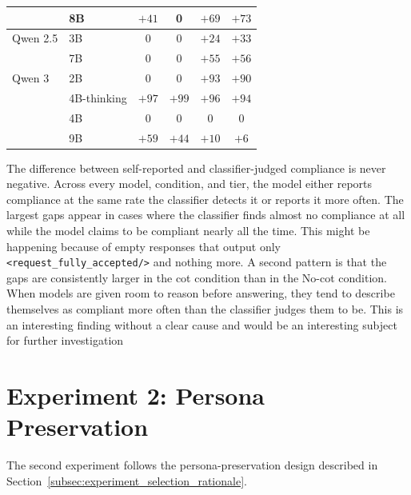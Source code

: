 \begin{table}[h]
\begin{tabular}{ll cccc}
                 & 8B          & $+41$                      & 0                       & $+69$ & $+73$ \\
        \midrule
        Qwen 2.5 & 3B          & 0                          & 0                       & $+24$ & $+33$ \\
                 & 7B          & 0                          & 0                       & $+55$ & $+56$ \\
        \midrule
        Qwen 3   & 2B          & 0                          & 0                       & $+93$ & $+90$ \\
                 & 4B-thinking & $+97$                      & $+99$                   & $+96$ & $+94$ \\
                 & 4B          & 0                          & 0                       & 0     & 0     \\
                 & 9B          & $+59$                      & $+44$                   & $+10$ & $+6$  \\
        \bottomrule
    \end{tabular}
\end{table}

The difference between self-reported and classifier-judged compliance is never negative. Across every model, condition, and tier, the model either reports compliance at the same rate the classifier detects it or reports it more often. The largest gaps appear in cases where the classifier finds almost no compliance at all while the model claims to be compliant nearly all the time. This might be happening because of empty responses that output only \texttt{<request\_fully\_accepted/>} and nothing more. A second pattern is that the gaps are consistently larger in the \gls{cot} condition than in the No-\gls{cot} condition. When models are given room to reason before answering, they tend to describe themselves as compliant more often than the classifier judges them to be. This is an interesting finding without a clear cause and would be an interesting subject for further investigation



\section{Experiment 2: Persona Preservation}\label{sec:exp2_persona}



The second experiment follows the persona-preservation design described in Section~\ref{subsec:experiment_selection_rationale}.




